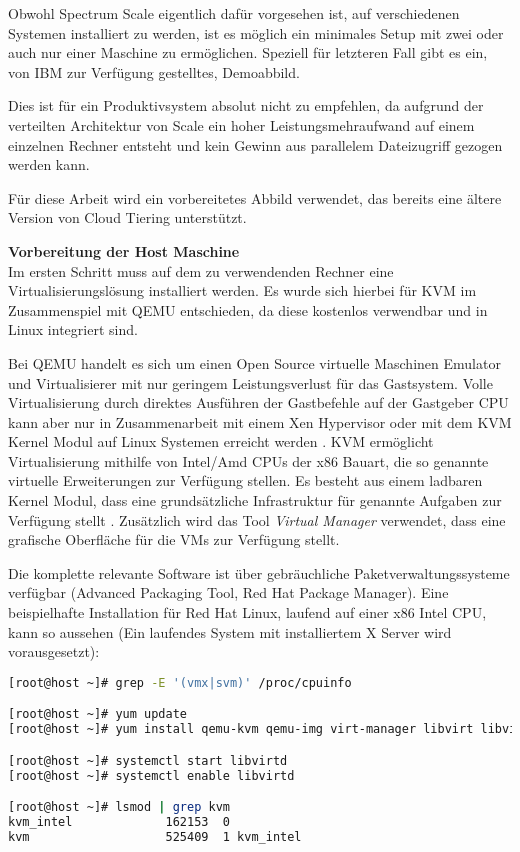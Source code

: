 Obwohl Spectrum Scale eigentlich dafür vorgesehen ist, auf verschiedenen Systemen installiert zu werden, ist es möglich ein minimales Setup mit zwei oder auch nur einer Maschine zu ermöglichen. Speziell für letzteren Fall gibt es ein, von IBM zur Verfügung gestelltes, Demoabbild.

Dies ist für ein Produktivsystem absolut nicht zu empfehlen, da aufgrund der verteilten Architektur von Scale ein hoher Leistungsmehraufwand auf einem einzelnen Rechner entsteht und kein Gewinn aus parallelem Dateizugriff gezogen werden kann.

Für diese Arbeit wird ein vorbereitetes Abbild verwendet, das bereits eine ältere Version von Cloud Tiering unterstützt.

\textbf{Vorbereitung der Host Maschine}\\
Im ersten Schritt muss auf dem zu verwendenden Rechner eine Virtualisierungslösung installiert werden. Es wurde sich hierbei für \ac{KVM} im Zusammenspiel mit \ac{QEMU} entschieden, da diese kostenlos verwendbar und in Linux integriert sind. 

Bei QEMU handelt es sich um einen Open Source virtuelle Maschinen Emulator und Virtualisierer mit nur geringem Leistungsverlust für das Gastsystem. Volle Virtualisierung durch direktes Ausführen der Gastbefehle auf der Gastgeber CPU kann aber nur in Zusammenarbeit mit einem Xen Hypervisor oder mit dem KVM Kernel Modul auf Linux Systemen erreicht werden \parencite{qemu.2017}. 
KVM ermöglicht Virtualisierung mithilfe von Intel/Amd CPUs der x86 Bauart, die so genannte virtuelle Erweiterungen zur Verfügung stellen. Es besteht aus einem ladbaren Kernel Modul, dass eine grundsätzliche Infrastruktur für genannte Aufgaben zur Verfügung stellt \parencite{kvm.2017}.
Zusätzlich wird das Tool \textit{Virtual Manager} verwendet, dass eine grafische Oberfläche für die \acs{VM}s zur Verfügung stellt.

Die komplette relevante Software ist über gebräuchliche Paketverwaltungssysteme verfügbar (Advanced Packaging Tool, Red Hat Package Manager). Eine beispielhafte Installation für Red Hat Linux, laufend auf einer x86 Intel CPU, kann so aussehen (Ein laufendes System mit installiertem X Server wird vorausgesetzt):\\ 

\begin{lstlisting}[language=bash, caption=Einrichtung von KVM und QEMU]
[root@host ~]# grep -E '(vmx|svm)' /proc/cpuinfo 

[root@host ~]# yum update
[root@host ~]# yum install qemu-kvm qemu-img virt-manager libvirt libvirt-python libvirt-client virt-install virt-viewer bridge-utils

[root@host ~]# systemctl start libvirtd
[root@host ~]# systemctl enable libvirtd

[root@host ~]# lsmod | grep kvm
kvm_intel             162153  0
kvm                   525409  1 kvm_intel
\end{lstlisting} 

